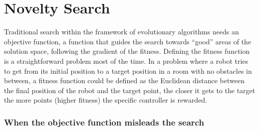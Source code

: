 \section{Novelty Search}
\label{NoveltySearch}

Traditional search within the framework of evolutionary algorithms needs an objective function, a function that guides the search towards ``good'' areas of the solution space, following the gradient of the fitness. Defining the fitness function is a straightforward problem most of the time. In a problem where a robot tries to get from its initial position to a target position in a room with no obstacles in between, a fitness function could be defined as the Euclidean distance between the final position of the robot and the target point, the closer it gets to the target the more points (higher fitness) the specific controller is rewarded.

\subsubsection*{When the objective function misleads the search}

